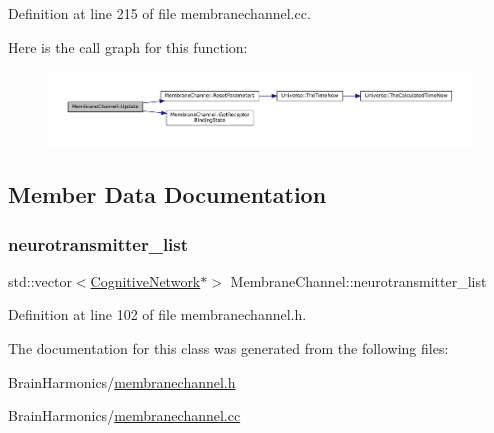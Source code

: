 Definition at line 215 of file membranechannel.\+cc.

Here is the call graph for this function\+:\nopagebreak
\begin{figure}[H]
\begin{center}
\leavevmode
\includegraphics[width=350pt]{class_membrane_channel_a34077828eee1c2457212f05217b09d6c_cgraph}
\end{center}
\end{figure}


\subsection{Member Data Documentation}
\mbox{\label{class_membrane_channel_ad603f58813157b33ca81b919cf9c2897}} 
\subsubsection{\texorpdfstring{neurotransmitter\+\_\+list}{neurotransmitter\_list}}
{\footnotesize\ttfamily std\+::vector$<$\mbox{\hyperlink{class_cognitive_network}{Cognitive\+Network}}$\ast$$>$ Membrane\+Channel\+::neurotransmitter\+\_\+list\hspace{0.3cm}{\ttfamily [protected]}}



Definition at line 102 of file membranechannel.\+h.



The documentation for this class was generated from the following files\+:\begin{DoxyCompactItemize}
\item 
Brain\+Harmonics/\mbox{\hyperlink{membranechannel_8h}{membranechannel.\+h}}\item 
Brain\+Harmonics/\mbox{\hyperlink{membranechannel_8cc}{membranechannel.\+cc}}\end{DoxyCompactItemize}
